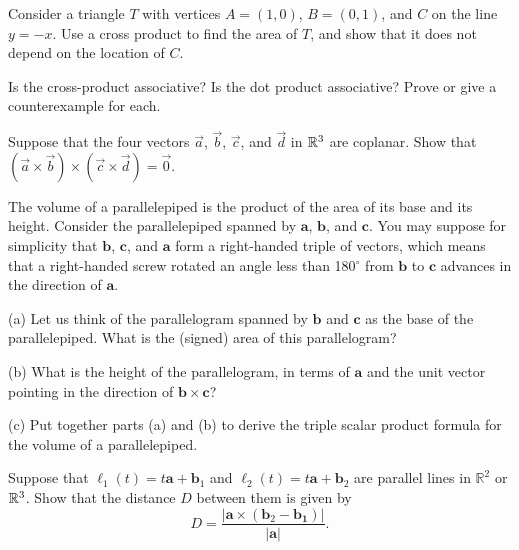 \documentclass[svgnames]{watsonbook}
\begin{document}
\begin{exercise}{}{}
  Consider a triangle $T$ with vertices $A=(1,0)$, $B=(0,1)$, and $C$ on the line $y=-x$. Use a cross product to find the area of $T$, and show that it does not depend on the location of $C$. 
\end{exercise}

\begin{exercise}{}{}
  Is the cross-product associative? Is the dot product associative?
  Prove or give a counterexample for each.
\end{exercise}

\begin{exercise}{}{}
  Suppose that the four vectors $\vec{a}$, $\vec{b}$, $\vec{c}$, and
  $\vec{d}$ in $\mathbb{R}^3$ are coplanar. Show that \\
  $(\vec{a}\times\vec{b})\times(\vec{c}\times\vec{d})=\vec{0}$.
\end{exercise}

\begin{exercise}{}{}
  The volume of a parallelepiped is the product of the area of its
  base and its height. Consider the parallelepiped spanned by
  $\mathbf{a}$, $\mathbf{b}$, and $\mathbf{c}$. You may suppose for
  simplicity that $\mathbf{b}$, $\mathbf{c}$, and $\mathbf{a}$ form a
  right-handed triple of vectors, which means that a right-handed
  screw rotated an angle less than 180$^\circ$ from $\mathbf{b}$ to
  $\mathbf{c}$ advances in the direction of $\mathbf{a}$.

  (a) Let us think of the parallelogram spanned by $\mathbf{b}$ and
  $\mathbf{c}$ as the base of the parallelepiped. What is the (signed)
  area of this parallelogram?

  (b) What is the height of the parallelogram, in terms of
  $\mathbf{a}$ and the unit vector pointing in the direction of
  $\mathbf{b} \times\mathbf{c}$?

  (c) Put together parts (a) and (b) to derive the triple scalar
  product formula for the volume of a parallelepiped.
\end{exercise}

\begin{exercise}{}{}
  Suppose that $\ell_1(t)=t\mathbf{a}+\mathbf{b}_1$ and $\ell_2(t)=t\mathbf{a}+\mathbf{b}_2$ are parallel lines in $\mathbb{R}^2$ or $\mathbb{R}^3$. Show that the distance $D$ between them is given by 
\[
D = \frac{|\mathbf{a}\times(\mathbf{b}_2-\mathbf{b_1})|}{|\mathbf{a}|}. 
\]
\end{exercise}
\end{document}
